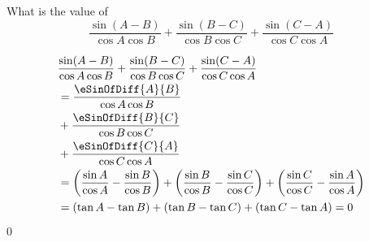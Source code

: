 

\question[2] What is the value of  
\[ \dfrac{\sin(A-B)}{\cos A\cos B} + \dfrac{\sin(B-C)}{\cos B\cos C} + \dfrac{\sin(C-A)}{\cos C\cos A} \]

\begin{solution}[\halfpage]
  \begin{align}
     & \dfrac{\sin(A-B)}{\cos A\cos B} + \dfrac{\sin(B-C)}{\cos B\cos C} + \dfrac{\sin(C-A)}{\cos C\cos A}\nonumber\\
     &= \dfrac{\eSinOfDiff{A}{B}}{\cos A\cos B} \nonumber\\
     &+ \dfrac{\eSinOfDiff{B}{C}}{\cos B\cos C} \nonumber\\
     &+ \dfrac{\eSinOfDiff{C}{A}}{\cos C\cos A} \\ 
     &= \left(\dfrac{\sin A}{\cos A} - \dfrac{\sin B}{\cos B} \right) 
     + \left(\dfrac{\sin B}{\cos B } - \dfrac{\sin C}{\cos C} \right) 
     + \left(\dfrac{\sin C }{\cos C } - \dfrac{\sin A}{\cos A} \right) \\
     &= (\tan A - \tan B) + (\tan B - \tan C) + (\tan C - \tan A) = 0
  \end{align}
\end{solution}
\ifprintanswers\begin{codex}$0$\end{codex}\fi
